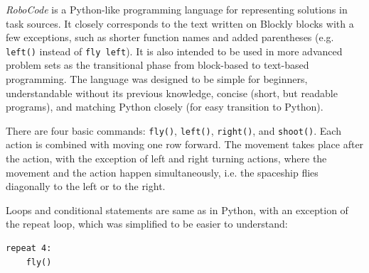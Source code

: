 \emph{RoboCode} is a Python-like programming language
for representing solutions in task sources.
It closely corresponds to the text written on Blockly blocks
with a few exceptions, such as %
shorter function names and added parentheses
(e.g. \texttt{left()} instead of \texttt{fly left}).
It is also intended to be used in more advanced problem sets as the
transitional phase from block-based to text-based programming.
The language was designed %
to be simple for beginners, understandable without its previous knowledge,
concise (short, but readable programs),
and matching Python closely (for easy transition to Python).



There are four basic commands: %
\texttt{fly()},
\texttt{left()},
\texttt{right()}, and
\texttt{shoot()}.
Each action is combined with moving one row forward.
The movement takes place after the action, with the exception of left and right turning actions, where the movement and the action happen simultaneously,
i.e. the spaceship flies diagonally to the left or to the right.

Loops and conditional statements are same as in Python,
with an exception of the repeat loop,
which was simplified %
to be easier to understand: %
\begin{lstlisting}
repeat 4:
    fly()
\end{lstlisting}

